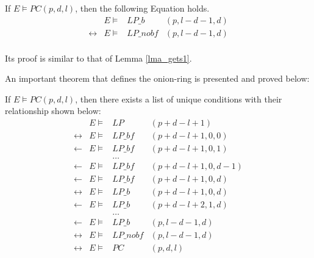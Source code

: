 \documentclass[journal]{IEEEtran}
\begin{document}
\begin{lemma}\label{lma_gets2}
If $E\vDash PC(p,d,l)$,
then the following Equation holds.
\begin{equation}\label{eq_gets2}
\begin{array}{llll}
&E\vDash& LP\_b&(p,l-d-1,d) \\
\leftrightarrow&E\vDash& LP\_nobf&(p,l-d-1,d) \\
\end{array}
\end{equation}
\end{lemma}

Its proof is similar to that of Lemma \ref{lma_gets1}.

An important theorem that defines the onion-ring is presented and proved below:

\begin{theorem}\label{thm_onionring}
If $E\vDash PC(p,d,l)$,
then there exists a list of unique conditions with their relationship shown below:
\begin{equation}\label{eq_onionring}
\begin{array}{llll}
&E\vDash& LP&(p+d-l+1)\\
\leftrightarrow&E\vDash& LP\_bf&(p+d-l+1,0,0) \\
\gets&E\vDash& LP\_bf&(p+d-l+1,0,1) \\
&& \dots &\\
\gets&E\vDash& LP\_bf&(p+d-l+1,0,d-1) \\
\gets&E\vDash& LP\_bf&(p+d-l+1,0,d) \\
\leftrightarrow&E\vDash& LP\_b&(p+d-l+1,0,d) \\
\gets&E\vDash& LP\_b&(p+d-l+2,1,d) \\
&& \dots &\\
\gets&E\vDash& LP\_b&(p,l-d-1,d) \\
\leftrightarrow&E\vDash& LP\_nobf&(p,l-d-1,d) \\
\leftrightarrow&E\vDash&PC&(p,d,l)
\end{array}
\end{equation}
\end{theorem}
\end{document}
